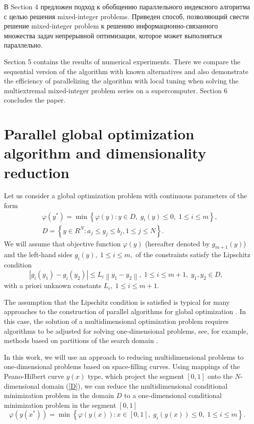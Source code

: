 \documentclass[
11pt,%
tightenlines,%
twoside,%
onecolumn,%
nofloats,%
nobibnotes,%
nofootinbib,%
superscriptaddress,%
noshowpacs,%
centertags]%
{revtex4}
\begin{document}
В Section 4 предложен подход к обобщению параллельного индексного алгоритма с целью решения mixed-integer problems. Приведен способ, позволяющий свести решение mixed-integer problem к решению информационно-связанного множества задач непрерывной оптимизации, которое может выполняться параллельно. 

Section 5 contains the results of numerical experiments. There we compare the sequential version of the algorithm with known alternatives and also demonstrate the efficiency of parallelizing the algorithm with local tuning when solving the multiextremal mixed-integer problem series on a supercomputer. 
Section 6 concludes the paper.

\section{Parallel global optimization algorithm and dimensionality reduction}

Let us consider a global optimization problem with continuous parameters of the form
\begin{eqnarray}\label{problem}
&\varphi(y^\ast)=\min{\left\{\varphi(y):y\in D, \; g_i(y)\leq 0, \; 1 \leq i \leq m\right\}},\\
&D=\left\{y\in R^N: a_j\leq y_j \leq b_j, 1\leq j \leq N \right\}.\label{D}
\end{eqnarray}
We will assume that objective function $\varphi(y)$ (hereafter denoted by $g_{m+1}(y)$) and the left-hand sides $g_i(y), \; 1\leq i \leq m,$ of the constraints satisfy the Lipschitz condition 
\[
\left|g_i(y_1)-g_i(y_2)\right|\leq L_i\left\|y_1-y_2\right\|, \;1\leq i\leq m+1, \; y_1,y_2 \in D,\;
\]
with a priori unknown constants $L_i, \; 1 \leq i \leq m+1$. 

The assumption that the Lipschitz condition is satisfied is typical for many approaches to the construction of parallel algorithms for global optimization \cite{Evtushenko2009,Zilinskas2011}. In this case, the solution of a multidimensional optimization problem requires algorithms to be adjusted for solving one-dimensional problems, see, for example, methods based on partitions of the search domain \cite{Zilinskas2014,Sergeyev2017}.

In this work, we will use an approach to reducing multidimensional problems to one-dimensional problems based on space-filling curves.
Using mappings of the Peano-Hilbert curve $y(x)$ type, which project the segment $[0,1]$ onto the $N$-dimensional domain (\ref{D}),
we can reduce the multidimensional conditional minimization problem in the domain $D$ to a one-dimensional conditional minimization problem in the segment $[0,1]$
\begin{equation}\label{problem1}
\varphi(y(x^\ast))=\min \left\{\varphi(y(x)): x \in [0,1], \; g_i(y(x))\leq 0, \; 1 \leq i \leq m\right\}.
\end{equation}
\end{document}
